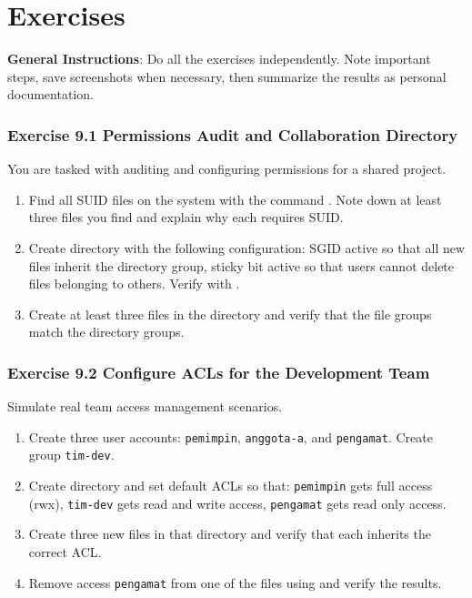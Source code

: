 \section{Exercises}
\label{sec:user-group-exercises}

\textbf{General Instructions}: Do all the exercises independently. Note important steps, save screenshots when necessary, then summarize the results as personal documentation.

\subsubsection*{Exercise 9.1 Permissions Audit and Collaboration Directory}
You are tasked with auditing and configuring permissions for a shared project.
\begin{enumerate}
\item Find all SUID files on the system with the command . Note down at least three files you find and explain why each requires SUID.
\item Create directory  with the following configuration: SGID active so that all new files inherit the directory group, sticky bit active so that users cannot delete files belonging to others. Verify with .
\item Create at least three files in the directory and verify that the file groups match the directory groups.
\end{enumerate}


\subsubsection*{Exercise 9.2 Configure ACLs for the Development Team}
Simulate real team access management scenarios.
\begin{enumerate}
\item Create three user accounts: \texttt{pemimpin}, \texttt{anggota-a}, and \texttt{pengamat}. Create group \texttt{tim-dev}.
\item Create directory  and set default ACLs so that: \texttt{pemimpin} gets full access (rwx), \texttt{tim-dev} gets read and write access, \texttt{pengamat} gets read only access.
\item Create three new files in that directory and verify that each inherits the correct ACL.
\item Remove access \texttt{pengamat} from one of the files using  and verify the results.
\end{enumerate}


